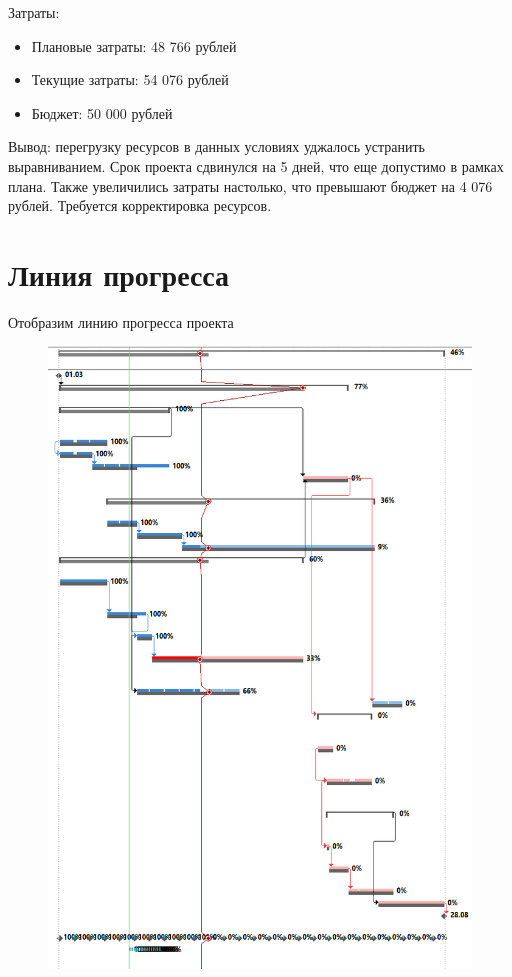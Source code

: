 Затраты:

\begin{itemize}
	\item Плановые затраты: 48 766 рублей
	\item Текущие затраты: 54 076 рублей
	\item Бюджет: 50 000 рублей
\end{itemize}

Вывод: перегрузку ресурсов в данных условиях уджалось устранить выравниванием. Срок проекта сдвинулся на 5 дней, что еще допустимо в рамках плана. Также увеличились затраты настолько, что превышают бюджет на 4 076 рублей. Требуется корректировка ресурсов.

\section*{Линия прогресса}

Отобразим линию прогресса проекта

\begin{figure}[H]
	\begin{center}
		\includegraphics[width=\textwidth]{imgs/task_1_21.png}
	\end{center}
\end{figure}

